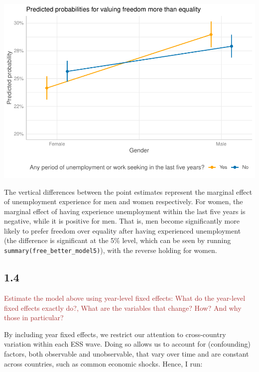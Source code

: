 \documentclass[
]{article}
\begin{document}
\includegraphics{AVCD-Assignment3-Edenhofer_files/figure-latex/predicted-probabilities-plot-1.pdf}

The vertical differences between the point estimates represent the
marginal effect of unemployment experience for men and women
respectively. For women, the marginal effect of having experience
unemployment within the last five years is negative, while it is
positive for men. That is, men become significantly more likely to
prefer freedom over equality after having experienced unemployment (the
difference is significant at the 5\% level, which can be seen by running
\texttt{summary(free\_better\_model5)}), with the reverse holding for
women.

\hypertarget{section-3}{%
\subsection{1.4}\label{section-3}}

\textcolor{brown}{Estimate the model above using year-level fixed effects: What do the year-level fixed effects exactly do?, What are the variables that change? How? And why those in particular?}

By including year fixed effects, we restrict our attention to
cross-country variation within each ESS wave. Doing so allows us to
account for (confounding) factors, both observable and unobservable,
that vary over time and are constant across countries, such as common
economic shocks. Hence, I run:
\end{document}
